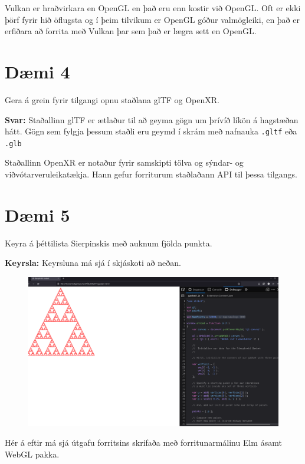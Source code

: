 \documentclass{article}
\begin{document}
Vulkan er hraðvirkara en OpenGL en það eru enn kostir við OpenGL.
Oft er ekki þörf fyrir hið öflugsta og í þeim tilvikum er OpenGL
góður valmögleiki, en það er erfiðara að forrita með Vulkan þar sem
það er lægra sett en OpenGL.

\section*{Dæmi 4}
Gera á grein fyrir tilgangi opnu staðlana glTF og OpenXR.

\smallskip\par\textbf{Svar:}
Staðallinn glTF er ætlaður til að geyma gögn um þrívíð líkön á hagstæðan hátt.
Gögn sem fylgja þessum staðli eru geymd í skrám með nafnauka \verb|.gltf| eða \verb|.glb|

Staðallinn OpenXR er notaður fyrir samskipti tölva og sýndar- og viðvótarveruleikatækja.
Hann gefur forriturum staðlaðann API til þessa tilgangs.

\newpage

\section*{Dæmi 5}
Keyra á þéttilista Sierpinskis með auknum fjölda punkta.

\smallskip\par\textbf{Keyrsla:}
Keyrsluna má sjá í skjáskoti að neðan.

\begin{figure}[!h]
    \centering
    \includegraphics[width=\textwidth]{keyrsla}
\end{figure}

Hér á eftir má sjá útgafu forritsins skrifaða með forritunarmálinu Elm
ásamt WebGL pakka.
\end{document}
